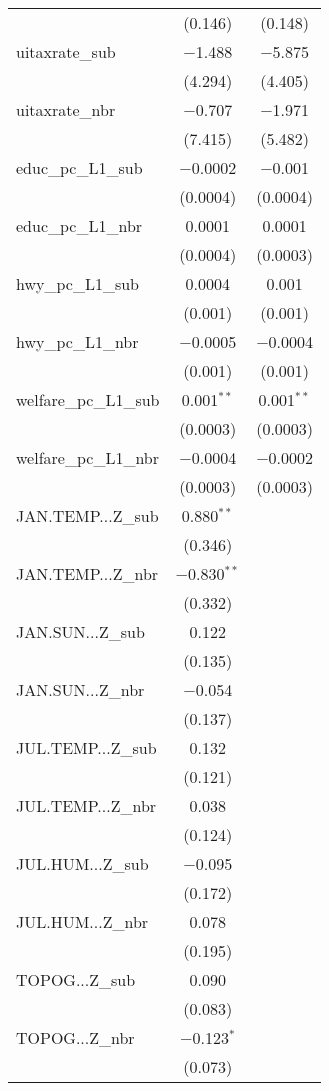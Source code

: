 \begin{table}[!htbp]
\begin{tabular}{@{\extracolsep{5pt}}lcc}
  & (0.146) & (0.148) \\ 
  uitaxrate\_sub & $-$1.488 & $-$5.875 \\ 
  & (4.294) & (4.405) \\ 
  uitaxrate\_nbr & $-$0.707 & $-$1.971 \\ 
  & (7.415) & (5.482) \\ 
  educ\_pc\_L1\_sub & $-$0.0002 & $-$0.001 \\ 
  & (0.0004) & (0.0004) \\ 
  educ\_pc\_L1\_nbr & 0.0001 & 0.0001 \\ 
  & (0.0004) & (0.0003) \\ 
  hwy\_pc\_L1\_sub & 0.0004 & 0.001 \\ 
  & (0.001) & (0.001) \\ 
  hwy\_pc\_L1\_nbr & $-$0.0005 & $-$0.0004 \\ 
  & (0.001) & (0.001) \\ 
  welfare\_pc\_L1\_sub & 0.001$^{**}$ & 0.001$^{**}$ \\ 
  & (0.0003) & (0.0003) \\ 
  welfare\_pc\_L1\_nbr & $-$0.0004 & $-$0.0002 \\ 
  & (0.0003) & (0.0003) \\ 
  JAN.TEMP...Z\_sub & 0.880$^{**}$ &  \\ 
  & (0.346) &  \\ 
  JAN.TEMP...Z\_nbr & $-$0.830$^{**}$ &  \\ 
  & (0.332) &  \\ 
  JAN.SUN...Z\_sub & 0.122 &  \\ 
  & (0.135) &  \\ 
  JAN.SUN...Z\_nbr & $-$0.054 &  \\ 
  & (0.137) &  \\ 
  JUL.TEMP...Z\_sub & 0.132 &  \\ 
  & (0.121) &  \\ 
  JUL.TEMP...Z\_nbr & 0.038 &  \\ 
  & (0.124) &  \\ 
  JUL.HUM...Z\_sub & $-$0.095 &  \\ 
  & (0.172) &  \\ 
  JUL.HUM...Z\_nbr & 0.078 &  \\ 
  & (0.195) &  \\ 
  TOPOG...Z\_sub & 0.090 &  \\ 
  & (0.083) &  \\ 
  TOPOG...Z\_nbr & $-$0.123$^{*}$ &  \\ 
  & (0.073) &  \\ 

\end{tabular}
\end{table}
